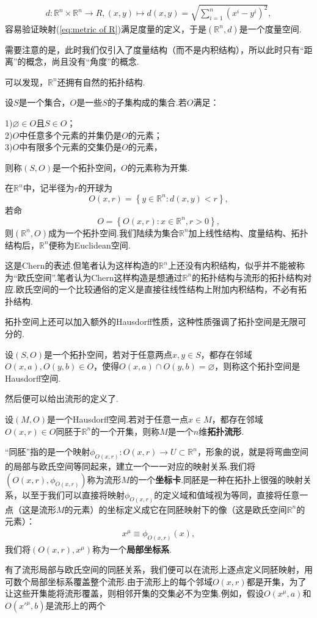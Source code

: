 	\begin{equation}\label{eq:metric of R}
		\begin{split}
			d:\mathbb{R}^n\times \mathbb{R}^n\rightarrow R,(x,y)\mapsto d(x,y)=\sqrt{\sum_{i=1}^n(x^i-y^i)^2},
		\end{split}
	\end{equation}
	容易验证映射(\ref{eq:metric of R})满足度量的定义，于是$(\mathbb{R}^n,d)$是一个度量空间.
	\begin{remark}
		需要注意的是，此时我们仅引入了度量结构（而不是内积结构），所以此时只有“距离”的概念，尚且没有“角度”的概念.
	\end{remark}
	可以发现，$\mathbb{R}^n$还拥有自然的拓扑结构.
	\begin{definition}
		设$S$是一个集合，$O$是一些$S$的子集构成的集合.若$O$满足：

		1)$\varnothing\in O$且$S\in O$；\\
		2)$O$中任意多个元素的并集仍是$O$的元素；\\
		3)$O$中有限多个元素的交集仍是$O$的元素，

		则称$(S,O)$是一个拓扑空间，$O$的元素称为开集.
	\end{definition}
	在$\mathbb{R}^n$中，记半径为$r$的开球为$$O(x,r)=\left\{y\in\mathbb{R}^n:d(x,y)<r\right\},$$若命
	$$O=\left\{O(x,r):x\in\mathbb{R}^n,r>0\right\},$$
	则$(\mathbb{R}^n,O)$成为一个拓扑空间.我们陆续为集合$\mathbb{R}^n$加上线性结构、度量结构、拓扑结构后，$\mathbb{R}^n$便称为Euclidean空间.
	\begin{remark}
		这是Chern的表述.但笔者认为这样构造的$\mathbb{R}^n$上还没有内积结构，似乎并不能被称为“欧氏空间”.笔者认为Chern这样构造是想通过$\mathbb{R}^n$的拓扑结构与流形的拓扑结构对应.欧氏空间的一个比较通俗的定义是直接往线性结构上附加内积结构，不必有拓扑结构.
	\end{remark}
	拓扑空间上还可以加入额外的Hausdorff性质，这种性质强调了拓扑空间是无限可分的.
	\begin{definition}
		设$(S,O)$是一个拓扑空间，若对于任意两点$x,y\in S$，都存在邻域$O(x,a),O(y,b)\in O$，使得$O(x,a)\cap O(y,b)=\varnothing$，则称这个拓扑空间是Hausdorff空间.
	\end{definition}
	然后便可以给出流形的定义了.
	\begin{definition}
		设$(M,O)$是一个Hausdorff空间.若对于任意一点$x\in M$，都存在邻域$O(x,r)\in O$同胚于$\mathbb{R}^n$的一个开集，则称$M$是一个$n$维\textbf{拓扑流形}.
	\end{definition}
	\begin{remark}
		“同胚”指的是一个映射$\phi_{O(x,r)}:O(x,r)\rightarrow U\subset \mathbb{R}^n$，形象的说，就是将弯曲空间的局部与欧氏空间等同起来，建立一个一一对应的映射关系.我们将$(O(x,r),\phi_{O(x,r)})$称为流形$M$的一个\textbf{坐标卡}.同胚是一种在拓扑上很强的映射关系，以至于我们可以直接将映射$\phi_{O(x,r)}$的定义域和值域视为等同，直接将任意一点（这是流形$M$的元素）的坐标定义成它在同胚映射下的像（这是欧氏空间$\mathbb{R}^n$的元素）：
		\begin{equation}
			\begin{split}
				x^\mu\equiv \phi_{O(x,r)}(x),
			\end{split}
		\end{equation}
		我们将$(O(x,r),x^\mu)$称为一个\textbf{局部坐标系}.
	\end{remark}
	有了流形局部与欧氏空间的同胚关系，我们便可以在流形上逐点定义同胚映射，用可数个局部坐标系覆盖整个流形.由于流形上的每个邻域$O(x,r)$都是开集，为了让这些开集能将流形覆盖，则相邻开集的交集必不为空集.例如，假设$O(x^\mu,a)$和$O({x'}^\mu,b)$是流形上的两个
	
